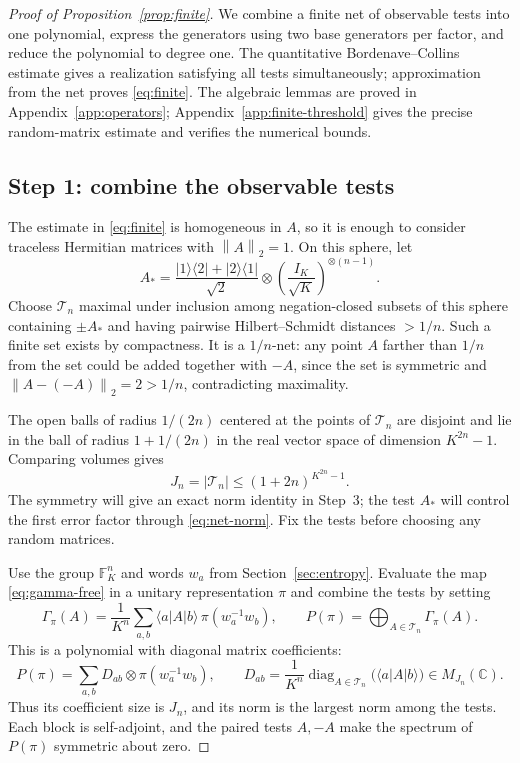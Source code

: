 \documentclass[11pt]{article}
\numberwithin{equation}{section}
\theoremstyle{boldremark}\newtheorem{remark}[theorem]{Remark}
\newcommand{\C}{\mathbb C}
\newcommand{\F}{\mathbb F}
\newcommand{\M}{M}
\newcommand{\norm}[1]{\left\lVert #1\right\rVert}
\newcommand{\ket}[1]{\lvert #1\rangle}
\newcommand{\bra}[1]{\langle #1\rvert}
\begin{document}
\begin{proof}[Proof of Proposition~\ref{prop:finite}]
We combine a finite net of observable tests into one polynomial,
express the generators using two base generators per factor, and
reduce the polynomial to degree one. The quantitative
Bordenave--Collins estimate gives a realization satisfying all tests
simultaneously; approximation from the net proves \eqref{eq:finite}.
The algebraic lemmas are proved in Appendix~\ref{app:operators};
Appendix~\ref{app:finite-threshold} gives the precise random-matrix
estimate and verifies the numerical bounds.

\subsection{Step 1: combine the observable tests}
\label{sec:finite-tests}

The estimate in \eqref{eq:finite} is homogeneous in $A$, so it is enough
to consider traceless Hermitian matrices with $\norm A_2=1$.
On this sphere, let
\[
 A_* =\frac{\ket1\bra2+\ket2\bra1}{\sqrt2}
       \otimes\left(\frac{I_K}{\sqrt K}\right)^{\otimes(n-1)}.
\]
Choose $\mathcal T_n$ maximal under inclusion among negation-closed
subsets of this sphere containing $\pm A_*$ and having pairwise
Hilbert--Schmidt distances $>1/n$. Such a finite set exists by compactness.
It is a $1/n$-net: any point $A$ farther than $1/n$ from the set could
be added together with $-A$, since the set is symmetric and
$\norm{A-(-A)}_2=2>1/n$, contradicting maximality.

The open balls of radius $1/(2n)$ centered at the points of
$\mathcal T_n$ are disjoint and lie in the ball of radius
$1+1/(2n)$ in the real vector space of dimension $K^{2n}-1$.
Comparing volumes gives
\begin{equation}
 J_n=|\mathcal T_n|\le(1+2n)^{K^{2n}-1}.
 \label{eq:net}
\end{equation}
The symmetry will give an exact norm identity in Step~3; the test
$A_*$ will control the first error factor through \eqref{eq:net-norm}.
Fix the tests before choosing any random matrices.

Use the group $\F_K^n$ and words $w_a$ from
Section~\ref{sec:entropy}. Evaluate the map \eqref{eq:gamma-free}
in a unitary representation $\pi$ and combine the tests by setting
\begin{equation}
 \Gamma_\pi(A)=\frac1{K^n}\sum_{a,b}\bra a A\ket b\,
                          \pi(w_a^{-1}w_b),
 \qquad P(\pi)=\bigoplus_{A\in\mathcal T_n}\Gamma_\pi(A).
 \label{eq:net-polynomial}
\end{equation}
This is a polynomial with diagonal matrix coefficients:
\[
 P(\pi)=\sum_{a,b}D_{ab}\otimes\pi(w_a^{-1}w_b),
 \qquad
 D_{ab}=\frac1{K^n}\operatorname{diag}_{A\in\mathcal T_n}
                         \bigl(\bra a A\ket b\bigr)\in\M_{J_n}(\C).
\]
Thus its coefficient size is $J_n$, and its norm is the largest norm
among the tests. Each block is self-adjoint, and the paired tests
$A,-A$ make the spectrum of $P(\pi)$ symmetric about zero.


\end{proof}
\end{document}
